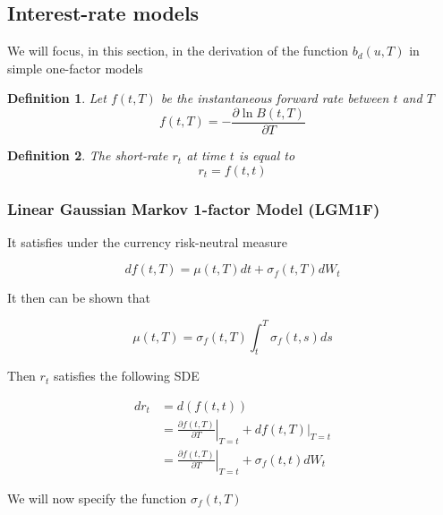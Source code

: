 \documentclass{article}
\newtheorem{definition}{Definition}[section]
\begin{document}
\subsection{Interest-rate models}
We will focus, in this section, in the derivation of the function $b_d(u,T)$ in simple one-factor models

\begin{definition}
Let $f(t,T)$ be the instantaneous forward rate between $t$ and $T$
\begin{equation}
	f(t,T) = -\frac{\partial \ln B(t,T)}{\partial T}
\end{equation}
\end{definition}

\begin{definition}
	The short-rate $r_t$ at time $t$ is equal to 
\begin{equation}
	r_t = f(t,t)
\end{equation}
\end{definition}

\subsubsection{Linear Gaussian Markov 1-factor Model (LGM1F)}

It satisfies under the currency risk-neutral measure

\begin{equation}	
	df(t,T) = \mu(t,T) dt + \sigma_f(t,T) dW_t
\end{equation}

\noindent It then can be shown that 

\begin{equation}
	\mu(t,T) = \sigma_f(t,T) \int_t^T \sigma_f(t,s) ds 
\end{equation}

\noindent Then $r_t$ satisfies the following SDE

\begin{equation}
\begin{aligned}
	dr_t &= d(f(t,t))\\
	&= \left.\frac{\partial f(t,T)}{\partial T}\right|_{T=t} + \left. df(t,T) \right|_{T=t}\\
	&= \left.\frac{\partial f(t,T)}{\partial T}\right|_{T=t} + \sigma_f(t,t) dW_t
\end{aligned}
\end{equation}

\noindent We will now specify the function $\sigma_f(t,T)$
\end{document}
